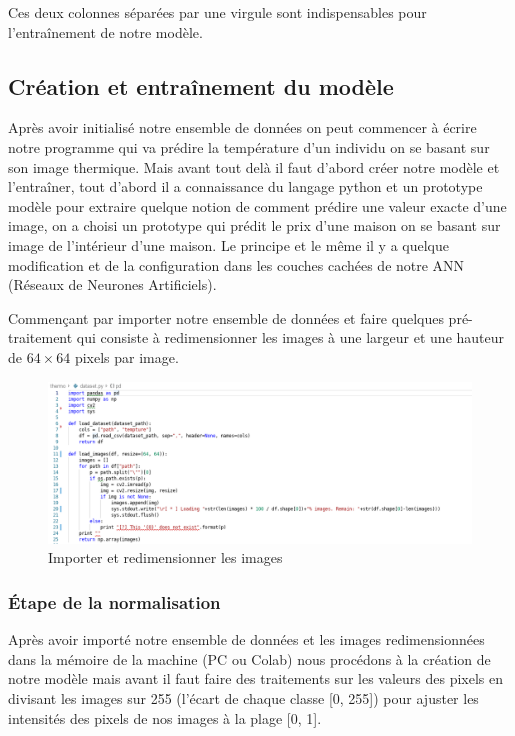 \documentclass[12pt]{article}
\begin{document}
Ces deux colonnes séparées par une virgule sont indispensables pour l’entraînement de notre modèle.

\subsection{Création et entraînement du modèle}
Après avoir initialisé notre ensemble de données on peut commencer à écrire notre programme qui va prédire la température d’un individu on se basant sur son image thermique. Mais avant tout delà il faut d’abord créer notre modèle et l’entraîner, tout d’abord il a  connaissance du langage python et un prototype modèle pour extraire quelque notion de comment prédire une valeur exacte d’une image, on a choisi un prototype qui prédit le prix d’une maison on se basant sur image de l'intérieur d’une maison. Le principe et le même il y a quelque modification et de la configuration dans les couches cachées de notre ANN (Réseaux de Neurones Artificiels).

Commençant par importer notre ensemble de données et faire quelques pré-traitement qui consiste à redimensionner les images à une largeur et une hauteur de $64 \times 64$ pixels par image.

\begin{figure}[h]
	\centering
	\includegraphics[width=16cm]{img-Chapiter-4/loaddataset.png}
	\caption{Importer et redimensionner les images}
\end{figure}
\subsubsection*{\' Etape de la normalisation}
Après avoir importé notre ensemble de données et les images redimensionnées dans la mémoire de la machine (PC ou Colab) nous procédons à la création de notre modèle mais avant il faut faire des traitements sur les valeurs des pixels en divisant les images sur 255 (l’écart de chaque classe [0, 255]) pour ajuster les intensités des pixels de nos images à la plage [0, 1].
\end{document}
